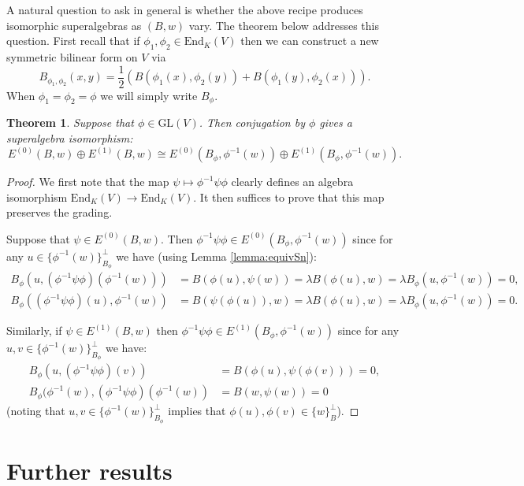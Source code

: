 \documentclass{amsart}
\theoremstyle{plain}
\newtheorem{theorem}{Theorem}[section]
\theoremstyle{definition}
\begin{document}
A natural question to ask in general is whether the above recipe produces isomorphic superalgebras as $(B,w)$ vary. The theorem below addresses this question. First recall that if $\phi_1, \phi_2\in\text{End}_K(V)$ then we can construct a new symmetric bilinear form on $V$ via \[B_{\phi_1,\phi_2}(x,y) = \frac{1}{2}(B(\phi_1(x),\phi_2(y))+B(\phi_1(y),\phi_2(x))).\] When $\phi_1=\phi_2=\phi$ we will simply write $B_{\phi}$.

\begin{theorem}
Suppose that $\phi\in\text{GL}(V)$. Then conjugation by $\phi$ gives a superalgebra isomorphism: \[E^{(0)}(B,w)\oplus E^{(1)}(B,w) \cong E^{(0)}(B_{\phi},\phi^{-1}(w))\oplus E^{(1)}(B_{\phi},\phi^{-1}(w)).\]
\end{theorem}

\begin{proof}
We first note that the map $\psi\mapsto \phi^{-1}\psi\phi$ clearly defines an algebra isomorphism $\text{End}_K(V)\rightarrow \text{End}_K(V)$. It then suffices to prove that this map preserves the grading.

Suppose that $\psi\in E^{(0)}(B,w)$. Then $\phi^{-1}\psi\phi\in E^{(0)}(B_{\phi},\phi^{-1}(w))$ since for any $u\in \{\phi^{-1}(w)\}^{\perp}_{B_{\phi}}$ we have (using Lemma \ref{lemma:equivSn}): \begin{align*}B_{\phi}(u, (\phi^{-1}\psi\phi)(\phi^{-1}(w))) &= B(\phi(u), \psi(w)) = \lambda B(\phi(u),w) = \lambda B_{\phi}(u,\phi^{-1}(w)) = 0,\\ B_{\phi}((\phi^{-1}\psi\phi)(u),\phi^{-1}(w)) &= B(\psi(\phi(u)), w) = \lambda B(\phi(u), w) = \lambda B_{\phi}(u, \phi^{-1}(w)) = 0.\end{align*}

Similarly, if $\psi\in E^{(1)}(B,w)$ then $\phi^{-1}\psi\phi\in E^{(1)}(B_{\phi},\phi^{-1}(w))$ since for any $u,v\in \{\phi^{-1}(w)\}^{\perp}_{B_{\phi}}$ we have: \begin{align*}B_{\phi}(u, (\phi^{-1}\psi\phi)(v)) &= B(\phi(u), \psi(\phi(v))) = 0,\\ B_{\phi}(\phi^{-1}(w), (\phi^{-1}\psi\phi)(\phi^{-1}(w)) &= B(w, \psi(w)) = 0\end{align*} (noting that $u,v\in \{\phi^{-1}(w)\}^{\perp}_{B_{\phi}}$ implies that $\phi(u),\phi(v)\in \{w\}^{\perp}_{B}$). 

\end{proof}

\section{Further results} 
\end{document}
